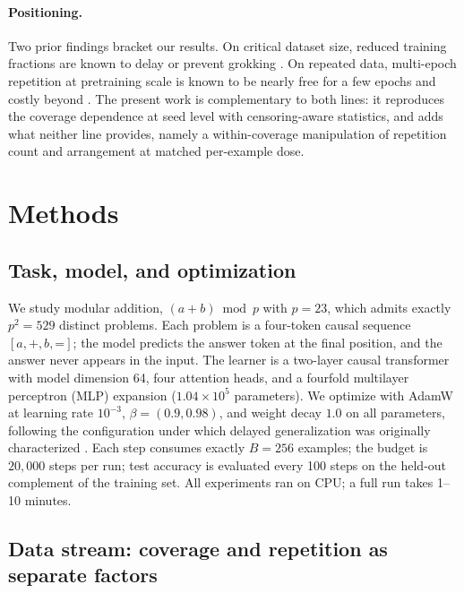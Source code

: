 \documentclass[10pt]{article}
\begin{document}
\paragraph{Positioning.}
Two prior findings bracket our results. On critical dataset size, reduced training fractions are known to delay or prevent grokking \citep{power2022grokking, liu2023omnigrok, varma2024explaining}. On repeated data, multi-epoch repetition at pretraining scale is known to be nearly free for a few epochs and costly beyond \citep{muennighoff2023scaling, allen-zhu2024physics}. The present work is complementary to both lines: it reproduces the coverage dependence at seed level with censoring-aware statistics, and adds what neither line provides, namely a within-coverage manipulation of repetition count and arrangement at matched per-example dose.

\section{Methods}

\subsection{Task, model, and optimization}
\label{sec:task}

We study modular addition, $(a+b) \bmod p$ with $p=23$, which admits exactly $p^2=529$ distinct problems. Each problem is a four-token causal sequence $[a, \texttt{+}, b, \texttt{=}]$; the model predicts the answer token at the final position, and the answer never appears in the input. The learner is a two-layer causal transformer \citep{vaswani2017attention} with model dimension 64, four attention heads, and a fourfold multilayer perceptron (MLP) expansion ($1.04\times10^{5}$ parameters). We optimize with AdamW \citep{loshchilov2019decoupled} at learning rate $10^{-3}$, $\beta=(0.9,0.98)$, and weight decay $1.0$ on all parameters, following the configuration under which delayed generalization was originally characterized \citep{power2022grokking, nanda2024progress}. Each step consumes exactly $B=256$ examples; the budget is $20{,}000$ steps per run; test accuracy is evaluated every 100 steps on the held-out complement of the training set. All experiments ran on CPU; a full run takes 1--10 minutes.

\subsection{Data stream: coverage and repetition as separate factors}
\label{sec:stream}
\end{document}
